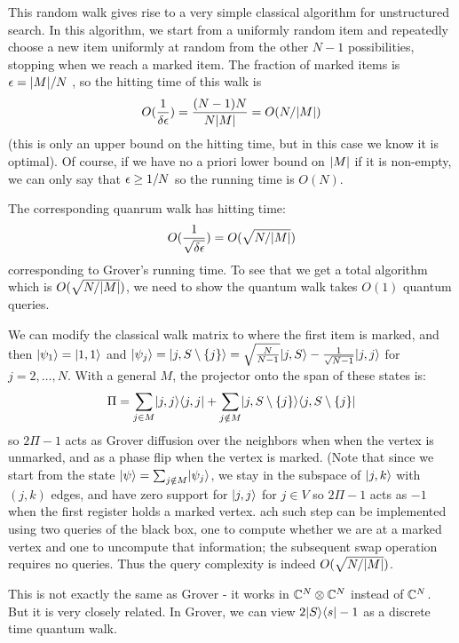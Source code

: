 This random walk gives rise to a very simple classical algorithm for unstructured search. In this algorithm, we start from a uniformly random item and repeatedly choose a new item uniformly at random from the other $N - 1$ possibilities, stopping when we reach a marked item. The fraction of marked items is $\epsilon = \lvert M \rvert/N$ , so the hitting time of this walk is
\begin{equation}
    O(\frac{1}{\delta\epsilon}) = \frac{(N-1)N}{N\lvert M \rvert} = O(N/\lvert M \rvert)
\end{equation}
(this is only an upper bound on the hitting time, but in this case we know it is optimal). Of course, if we have no a priori lower bound on $\lvert M \rvert$ if it is non-empty, we can only say that $\epsilon \geq 1/N$ so the running time is $O(N)$.

The corresponding quanrum walk has hitting time:
\begin{equation}
    O(\frac{1}{\sqrt{\delta\epsilon}}) = O(\sqrt{N/\lvert M \rvert})
\end{equation}
corresponding to Grover's running time. To see that we get a total algorithm which is $O(\sqrt{N/\lvert M \rvert})$, we need to show the quantum walk takes $O(1)$ quantum queries.

We can modify the classical walk matrix to where the first item is marked, and then $\lvert \psi_1 \rangle = \lvert 1, 1 \rangle$ and $\lvert \psi_j \rangle = \lvert j, S\setminus\set{j} \rangle = \sqrt{\frac{N}{N-1}}\lvert j, S \rangle - \frac{1}{\sqrt{N-1}}\lvert j, j \rangle$ for $j = 2, \ldots, N$. With a general $M$, the projector onto the span of these states is:
\begin{equation}
    \Pi = \sum_{j\in M}\lvert j, j \rangle \langle j, j \rvert + \sum_{j \notin M}\lvert j, S \setminus \set{j} \rangle \langle j, S \setminus \set{j} \rvert
\end{equation}
so $2\Pi - 1$ acts as Grover diffusion over the neighbors when when the vertex is unmarked, and as a phase flip when the vertex is marked. (Note that since we start from the state $\lvert \psi \rangle = \sum_{j \notin M}\lvert \psi_j \rangle$, we stay in the subspace of $\lvert j, k \rangle$ with $(j, k)$ edges, and have zero support for $\lvert j, j \rangle$ for $j \in V$ so $2\Pi - 1$ acts as $-1$ when the first register holds a marked vertex. ach such step can be implemented using two queries of the black box, one to compute whether we are at a marked vertex and one to uncompute that information; the subsequent swap operation requires no queries. Thus the query complexity is indeed $O(\sqrt{N/\lvert M \rvert})$.

This is not exactly the same as Grover - it works in $\mathbb{C}^N \otimes \mathbb{C}^N$ instead of $\mathbb{C}^N$. But it is very closely related. In Grover, we can view $2\lvert S \rangle \langle s \rvert - 1$ as a discrete time quantum walk. 

